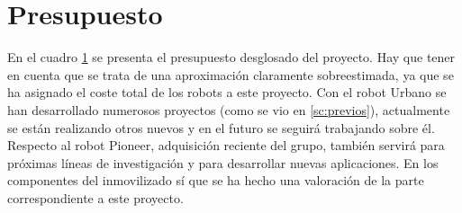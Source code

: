 
\chapter{Presupuesto}\label{presupuesto}

En el cuadro \ref{presupuesto} se presenta el presupuesto desglosado del proyecto. Hay que tener en cuenta que se trata de una aproximación claramente sobreestimada, ya que se ha asignado el coste total de los robots a este proyecto. Con el robot Urbano se han desarrollado numerosos proyectos (como se vio en \ref{sc:previos}), actualmente se están realizando otros nuevos y en el futuro se seguirá trabajando sobre él. Respecto al robot Pioneer, adquisición reciente del grupo, también servirá para próximas líneas de investigación y para desarrollar nuevas aplicaciones. En los componentes del inmovilizado sí que se ha hecho una valoración de la parte correspondiente a este proyecto.

